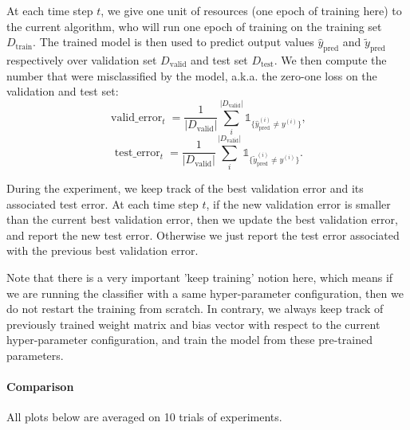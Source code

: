 \documentclass[runningheads,a4paper]{llncs}
\begin{document}
At each time step $t$, we give one unit of resources (one epoch of training here) to the current algorithm, who will run one epoch of training on the training set $D_{\operatorname{train}}$. The trained model is then used to predict output values $\hat{y}_{\operatorname{pred}}$ and $\tilde{y}_{\operatorname{pred}}$ respectively over validation set $D_{\operatorname{valid}}$ and test set $D_{\operatorname{test}}$. We then compute the number that were misclassified by the model, a.k.a. the zero-one loss on the validation and test set:
\[
\operatorname{valid\_error}_t = \frac{1}{|D_{\operatorname{valid}}|} \sum_i^{|D_{\operatorname{valid}}|} \mathbb{1}_{\{\hat{y}_{\operatorname{pred}}^{(i)} \neq y^{(i)}\}},
\]
\[
\operatorname{test\_error}_t = \frac{1}{|D_{\operatorname{valid}}|} \sum_i^{|D_{\operatorname{valid}}|} \mathbb{1}_{\{\tilde{y}_{\operatorname{pred}}^{(i)} \neq y^{(i)}\}}.
\]

During the experiment, we keep track of the best validation error and its associated test error. At each time step $t$, if the new validation error is smaller than the current best validation error, then we update the best validation error, and report the new test error. Otherwise we just report the test error associated with the previous best validation error.

Note that there is a very important 'keep training' notion here, which means if we are running the classifier with a same hyper-parameter configuration, then we do not restart the training from scratch. In contrary, we always keep track of previously trained weight matrix and bias vector with respect to the current hyper-parameter configuration, and train the model from these pre-trained parameters.

\paragraph{\textbf{Comparison}}
All plots below are averaged on 10 trials of experiments.
\end{document}
